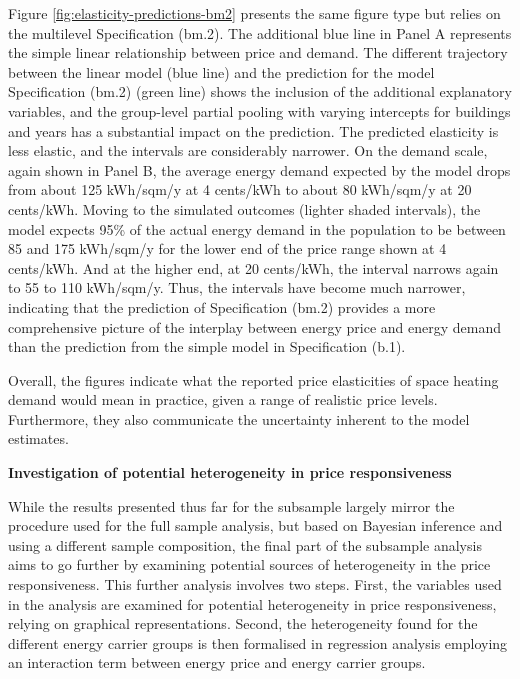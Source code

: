 \documentclass[12pt,twoside]{reedthesis}
\begin{document}
Figure \ref{fig:elasticity-predictions-bm2} presents the same figure type but relies on the multilevel Specification (bm.2). The additional blue line in Panel A represents the simple linear relationship between price and demand. The different trajectory between the linear model (blue line) and the prediction for the model Specification (bm.2) (green line) shows the inclusion of the additional explanatory variables, and the group-level partial pooling with varying intercepts for buildings and years has a substantial impact on the prediction. The predicted elasticity is less elastic, and the intervals are considerably narrower. On the demand scale, again shown in Panel B, the average energy demand expected by the model drops from about 125 kWh/sqm/y at 4 cents/kWh to about 80 kWh/sqm/y at 20 cents/kWh. Moving to the simulated outcomes (lighter shaded intervals), the model expects 95\% of the actual energy demand in the population to be between 85 and 175 kWh/sqm/y for the lower end of the price range shown at 4 cents/kWh. And at the higher end, at 20 cents/kWh, the interval narrows again to 55 to 110 kWh/sqm/y. Thus, the intervals have become much narrower, indicating that the prediction of Specification (bm.2) provides a more comprehensive picture of the interplay between energy price and energy demand than the prediction from the simple model in Specification (b.1).

Overall, the figures indicate what the reported price elasticities of space heating demand would mean in practice, given a range of realistic price levels. Furthermore, they also communicate the uncertainty inherent to the model estimates.

\textbf{Investigation of potential heterogeneity in price responsiveness}

While the results presented thus far for the subsample largely mirror the procedure used for the full sample analysis, but based on Bayesian inference and using a different sample composition, the final part of the subsample analysis aims to go further by examining potential sources of heterogeneity in the price responsiveness. This further analysis involves two steps. First, the variables used in the analysis are examined for potential heterogeneity in price responsiveness, relying on graphical representations. Second, the heterogeneity found for the different energy carrier groups is then formalised in regression analysis employing an interaction term between energy price and energy carrier groups.
\end{document}

